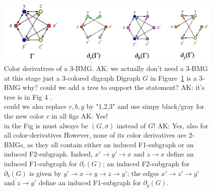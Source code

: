 \documentclass[final,3p,times]{elsarticle}
\newcommand{\TODO}[1]{\begingroup\color{red}#1\endgroup}
\begin{document}
\begin{figure}[ht]
  \centering
    \includegraphics[width=16cm]{figures/color_derivatives.png}
    \caption{Color derivatives of a 3-BMG. \TODO{AK: we actually don't need a 3-BMG at this stage just a 3-colored digraph}
    Digraph $G$ in Figure~\ref{fig:color_derivatives} is a 3-BMG
    \TODO{why? could we add a tree to support the statement? AK: it's tree is in Fig 4 }.\\
    \TODO{could we also replace $r,b,y$ by "1,2,3" and use simpy black/gray
    for the new color $c$ in all figs AK: Yes!}\\
    \TODO{in the Fig is must always be $(G,\sigma)$ instead of $G$! AK: Yes, also for all color-derivatives}
     However,
    none of its color derivatives are 2-BMGs, as they all contain either an
    induced F1-subgraph or an induced F2-subgraph. Indeed, $x'\rightarrow
    y'\rightarrow x$ and $z\rightarrow x$ define an induced F1-subgraph for
    $\partial_r(G)$; an induced F2-subgraph for $\partial_b(G)$ is
    given by $y'\rightarrow x\rightarrow y\rightarrow z\rightarrow y'$; the
    edges $x'\rightarrow z'\rightarrow y'$ and $z \rightarrow y'$ define an
    induced F1-subgraph for $\partial_y(G)$.
}
   \label{fig:color_derivatives}
\end{figure}
\end{document}
